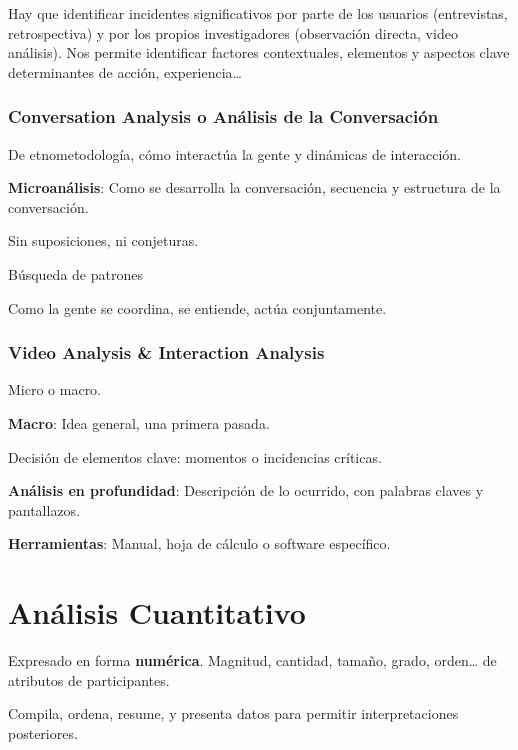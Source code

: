\documentclass[12pt]{report} %
\begin{document}
Hay que identificar incidentes significativos por parte de los usuarios
(entrevistas, retrospectiva) y por los propios investigadores
(observación directa, video análisis). Nos permite identificar factores
contextuales, elementos y aspectos clave determinantes de acción,
experiencia\ldots{}

\hypertarget{conversation-analysis-o-anuxe1lisis-de-la-conversaciuxf3n}{%
\subsubsection{Conversation Analysis o Análisis de la
Conversación}\label{conversation-analysis-o-anuxe1lisis-de-la-conversaciuxf3n}}

De etnometodología, cómo interactúa la gente y dinámicas de interacción.

\textbf{Microanálisis}: Como se desarrolla la conversación, secuencia y
estructura de la conversación.

Sin suposiciones, ni conjeturas.

Búsqueda de patrones

Como la gente se coordina, se entiende, actúa conjuntamente.

\hypertarget{video-analysis-interaction-analysis}{%
\subsubsection{Video Analysis \& Interaction
Analysis}\label{video-analysis-interaction-analysis}}

Micro o macro.

\textbf{Macro}: Idea general, una primera pasada.

Decisión de elementos clave: momentos o incidencias críticas.

\textbf{Análisis en profundidad}: Descripción de lo ocurrido, con
palabras claves y pantallazos.

\textbf{Herramientas}: Manual, hoja de cálculo o software específico.

\section{Análisis Cuantitativo}

Expresado en forma \textbf{numérica}. Magnitud, cantidad, tamaño, grado,
orden\ldots{} de atributos de participantes.

Compila, ordena, resume, y presenta datos para permitir interpretaciones
posteriores.
\end{document}
